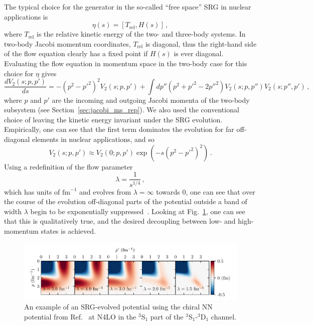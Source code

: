 The typical choice for the generator in the so-called ``free space'' SRG in nuclear applications is
\begin{equation}
  \eta(s) = [T_{\text{rel}}, H(s)]\,,
\end{equation}
where $T_{\text{rel}}$ is the relative kinetic energy of the two- and three-body systems.
In two-body Jacobi momentum coordinates, $T_{\text{rel}}$ is diagonal,
thus the right-hand side of the flow equation clearly has a fixed point if $H(s)$ is ever diagonal.
Evaluating the flow equation in momentum space in the two-body case for this choice for $\eta$ gives
\begin{equation}
  \frac{dV_2(s; p, p')}{ds} = - {(p^2 - {p'}^2)}^2 V_2(s; p, p') + \int dp'' (p^2 + {p'}^2 - 2 {p''}^2) V_2(s; p, p'') V_2(s; p'', p')\,,
\end{equation}
where $p$ and $p'$ are the incoming and outgoing Jacobi momenta of the two-body subsystem
(see Section~\ref{sec:jacobi_ms_rep}).
We also used the conventional choice of leaving the kinetic energy invariant under the SRG evolution.
Empirically, one can see that the first term dominates the evolution for far off-diagonal elements in nuclear applications,
and so
\begin{equation}
  V_2(s; p, p') \approx V_2(0; p, p') \exp(- s {(p^2 - {p'}^2)}^2)\,.
\end{equation}
Using a redefinition of the flow parameter
\begin{equation}
  \lambda = \frac{1}{s^{1/4}}\,,
\end{equation}
which has units of $\text{fm}^{-1}$ and evolves from $\lambda=\infty$ towards 0,
one can see that over the course of the evolution
off-diagonal parts of the potential outside a band of width $\lambda$ begin to be exponentially suppressed~\cite{Jurg07srgdec}.
Looking at Fig.~\ref{fig:srg_evolved_potential}, one can see that this is qualitatively true,
and the desired decoupling between low- and high-momentum states is achieved.

\begin{figure}[t]
  \centering
  \includegraphics[width=\textwidth]{proposal/doc/images/vnn_srg_emn500_n3lo.pdf}
  \caption[
    An example of an SRG-evolved potential using the chiral EMN NN potential
    at N4LO
    in the ${}^3$S${}_1$ part of the ${}^3$S${}_1$-${}^3$D${}_1$ channel.
  ]{
    An example of an SRG-evolved potential using the chiral NN potential
    from Ref.~\cite{Ente17n4lonn} at N4LO
    in the ${}^3$S${}_1$ part of the ${}^3$S${}_1$-${}^3$D${}_1$ channel.
  }\label{fig:srg_evolved_potential}
\end{figure}

